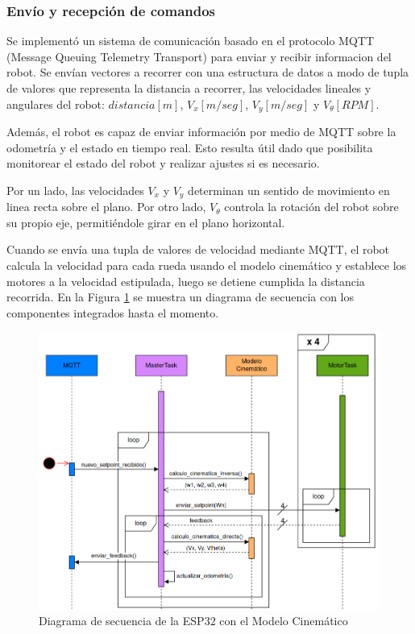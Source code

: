 \subsubsection{Envío y recepción de comandos}

Se implementó un sistema de comunicación basado en el protocolo MQTT (Message Queuing Telemetry Transport) para enviar y recibir informacion del robot. Se envían vectores a recorrer con una estructura de datos a modo de tupla de valores que representa la distancia a recorrer, las velocidades lineales y angulares del robot: $distancia [m]$, $V_x [m/seg]$, $V_y [m/seg]$ y $V_\theta [RPM]$.

Además, el robot es capaz de enviar información por medio de MQTT sobre la odometría y el estado en tiempo real. Esto resulta útil dado que posibilita monitorear el estado del robot y realizar ajustes si es necesario.

Por un lado, las velocidades $V_x$ y $V_y$ determinan un sentido de movimiento en linea recta sobre el plano. Por otro lado, $V_\theta$ controla la rotación del robot sobre su propio eje, permitiéndole girar en el plano horizontal.

Cuando se envía una tupla de valores de velocidad mediante MQTT, el robot calcula la velocidad para cada rueda usando el modelo cinemático y establece los motores a la velocidad estipulada, luego se detiene cumplida la distancia recorrida. En la Figura \ref{fig:diagcomponentesp32conmodelocinem} se muestra un diagrama de secuencia con los componentes integrados hasta el momento.

\begin{figure}[H]
    \centering
    \includegraphics[width=1\linewidth]{images/diag_secuencia_full_modelo_cinematico.png}
    \caption{Diagrama de secuencia de la ESP32 con el Modelo Cinemático}
    \label{fig:diagcomponentesp32conmodelocinem}
\end{figure}
